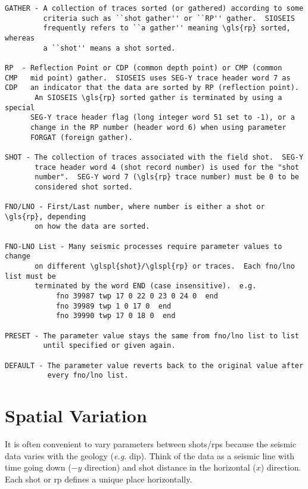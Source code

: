\begin{verbatim}
GATHER - A collection of traces sorted (or gathered) according to some
         criteria such as ``shot gather'' or ``RP'' gather.  SIOSEIS
         frequently refers to ``a gather'' meaning \gls{rp} sorted, whereas
         a ``shot'' means a shot sorted.

RP  - Reflection Point or CDP (common depth point) or CMP (common
CMP   mid point) gather.  SIOSEIS uses SEG-Y trace header word 7 as
CDP   an indicator that the data are sorted by RP (reflection point).
       An SIOSEIS \gls{rp} sorted gather is terminated by using a special
      SEG-Y trace header flag (long integer word 51 set to -1), or a
      change in the RP number (header word 6) when using parameter
      FORGAT (foreign gather).

SHOT - The collection of traces associated with the field shot.  SEG-Y
       trace header word 4 (shot record number) is used for the "shot
       number".  SEG-Y word 7 (\gls{rp} trace number) must be 0 to be
       considered shot sorted.

FNO/LNO - First/Last number, where number is either a shot or \gls{rp}, depending
       on how the data are sorted.

FNO-LNO List - Many seismic processes require parameter values to change
       on different \glspl{shot}/\glspl{rp} or traces.  Each fno/lno list must be
       terminated by the word END (case insensitive).  e.g.
            fno 39987 twp 17 0 22 0 23 0 24 0  end
            fno 39989 twp 1 0 17 0  end
            fno 39990 twp 17 0 18 0  end

PRESET - The parameter value stays the same from fno/lno list to list
         until specified or given again.

DEFAULT - The parameter value reverts back to the original value after
          every fno/lno list.
\end{verbatim}

\chapter{Spatial Variation}
\label{c_spatial_variation}

It is often convenient to vary parameters between \glspl{shot}/\glspl{rp} because the
seismic data varies with the geology (\textit{e.g.} dip).  Think of the data as
a seismic line with time going down ($-y$ direction) and \gls{shot} distance in
the horizontal ($x$) direction.  Each \gls{shot} or \gls{rp} defines a unique place
horizontally.

